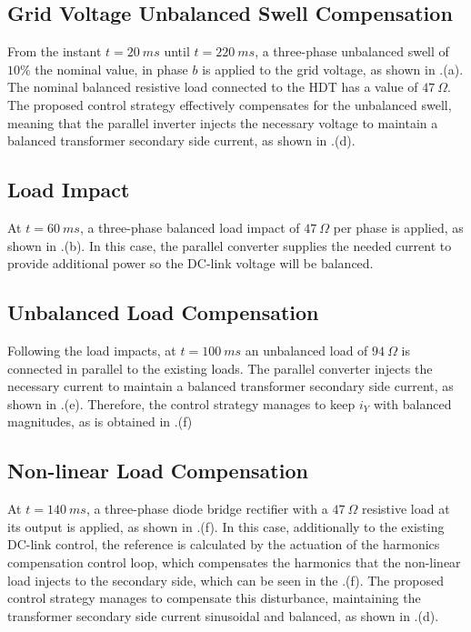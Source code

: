 \subsection{Grid Voltage Unbalanced Swell Compensation}

From the instant $t = 20\ ms$ until $t = 220\ ms$, a three-phase unbalanced swell of $10\%$ the nominal value, in phase $b$ is applied to the grid voltage, as shown in .(a). The nominal balanced resistive load connected to the HDT has a value of $47\ \Omega$. The proposed control strategy effectively compensates for the unbalanced swell, meaning that the parallel inverter injects the necessary voltage to maintain a balanced transformer secondary side current, as shown in .(d).

\subsection{Load Impact}

At $t = 60\ ms$, a three-phase balanced load impact of $47\ \Omega$ per phase is applied, as shown in .(b). In this case, the parallel converter supplies the needed current to provide additional power so the DC-link voltage will be balanced.

\subsection{Unbalanced Load Compensation}

Following the load impacts, at $t = 100\ ms$ an unbalanced load of $94\ \Omega$ is connected in parallel to the existing loads. The parallel converter injects the necessary current to maintain a balanced transformer secondary side current, as shown in .(e). Therefore, the control strategy manages to keep $i_Y$ with balanced magnitudes, as is obtained in .(f)

\subsection{Non-linear Load Compensation}

At $t = 140\ ms$, a three-phase diode bridge rectifier with a $47\ \Omega$ resistive load at its output is applied, as shown in .(f). In this case, additionally to the existing DC-link control, the reference is calculated by the actuation of the harmonics compensation control loop, which compensates the harmonics that the non-linear load injects to the secondary side, which can be seen in the .(f). The proposed control strategy manages to compensate this disturbance, maintaining the transformer secondary side current sinusoidal and balanced, as shown in .(d).

